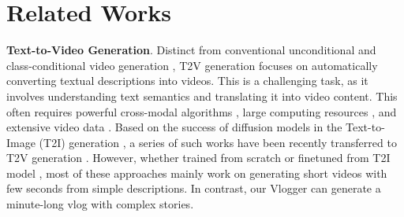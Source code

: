 \section{Related Works}
\label{sec:related}


\noindent\textbf{Text-to-Video Generation}.
Distinct from conventional unconditional and class-conditional video generation \cite{Wang2020ImaGINatorCS, Wang2019G3ANDA, Wang2021InMoDeGANIM, Chen2020LongTermVP, Clark2019AdversarialVG, Brooks2022GeneratingLV, Yu2022GeneratingVW, Skorokhodov2021StyleGANVAC, Tian2021AGI, Bhagat2020DisentanglingMF, Xie2019MotionBasedGM, Yan2021VideoGPTVG, Ge2022LongVG}, 
T2V generation focuses on automatically converting textual descriptions into videos. 
This is a challenging task,
as it involves understanding text semantics and translating it into video content.
This often requires 
powerful cross-modal algorithms \cite{radford2021learning}, 
large computing resources \cite{Hestness2017DeepLS, Chollet2019OnTM}, 
and extensive video data \cite{schuhmann2022laion5b, bain2021frozen, Wang2023LAVIEHV, Wang2022InternVideoGV, Xue2021AdvancingHV, Schuhmann2021LAION400MOD}.
Based on the success of diffusion models in the Text-to-Image (T2I) generation \cite{Nichol2021GLIDETP, rombach2022highResolution, Ramesh2022HierarchicalTI, saharia2022imagen, Balaji2022eDiffITD, Kusupati2022MatryoshkaRL, Dai2023EmuEI, BetkerImprovingIG},
a series of such works have been recently transferred to T2V generation \cite{singer2023makeavideo, Ho2022ImagenVH, blattmann2023align, Wang2023LAVIEHV, Ge2023PreserveYO, Zhang2023Show1MP, Wang2023VideoFactorySA, Wang2023ModelScopeTT}. 
However,
whether trained from scratch \cite{Ho2022ImagenVH, singer2023makeavideo} or finetuned from T2I model \cite{blattmann2023align, Ge2023PreserveYO, Wang2023LAVIEHV, Wang2023ModelScopeTT, Zhang2023Show1MP, Wang2023VideoFactorySA}, 
most of these approaches mainly work on generating short videos with few seconds from simple descriptions.
In contrast,
our Vlogger can generate a minute-long vlog with complex stories.



